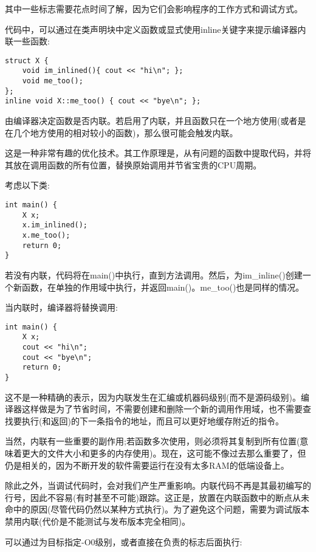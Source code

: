 其中一些标志需要花点时间了解，因为它们会影响程序的工作方式和调试方式。


代码中，可以通过在类声明块中定义函数或显式使用inline关键字来提示编译器内联一些函数:

\begin{lstlisting}[style=styleCXX]
struct X {
	void im_inlined(){ cout << "hi\n"; };
	void me_too();
};
inline void X::me_too() { cout << "bye\n"; };
\end{lstlisting} 

由编译器决定函数是否内联。若启用了内联，并且函数只在一个地方使用(或者是在几个地方使用的相对较小的函数)，那么很可能会触发内联。

这是一种非常有趣的优化技术。其工作原理是，从有问题的函数中提取代码，并将其放在调用函数的所有位置，替换原始调用并节省宝贵的CPU周期。

考虑以下类:

\begin{lstlisting}[style=styleCXX]
int main() {
	X x;
	x.im_inlined();
	x.me_too();
	return 0;
}
\end{lstlisting} 

若没有内联，代码将在main()中执行，直到方法调用。然后，为im\_inline()创建一个新函数，在单独的作用域中执行，并返回main()。me\_too()也是同样的情况。

当内联时，编译器将替换调用:

\begin{lstlisting}[style=styleCXX]
int main() {
	X x;
	cout << "hi\n";
	cout << "bye\n";
	return 0;
}
\end{lstlisting} 

这不是一种精确的表示，因为内联发生在汇编或机器码级别(而不是源码级别)。编译器这样做是为了节省时间，不需要创建和删除一个新的调用作用域，也不需要查找要执行(和返回)的下一条指令的地址，而且可以更好地缓存附近的指令。

当然，内联有一些重要的副作用;若函数多次使用，则必须将其复制到所有位置(意味着更大的文件大小和更多的内存使用)。现在，这可能不像过去那么重要了，但仍是相关的，因为不断开发的软件需要运行在没有太多RAM的低端设备上。

除此之外，当调试代码时，会对我们产生严重影响。内联代码不再是其最初编写的行号，因此不容易(有时甚至不可能)跟踪。这正是，放置在内联函数中的断点从未命中的原因(尽管代码仍然以某种方式执行)。为了避免这个问题，需要为调试版本禁用内联(代价是不能测试与发布版本完全相同)。

可以通过为目标指定-O0级别，或者直接在负责的标志后面执行:


